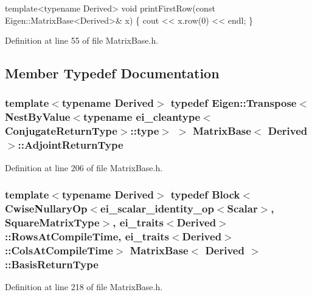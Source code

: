 \begin{DoxyCode}
\textcolor{keyword}{template}<\textcolor{keyword}{typename} Derived>
\textcolor{keywordtype}{void} printFirstRow(\textcolor{keyword}{const} Eigen::MatrixBase<Derived>& x)
\{
  cout << x.row(0) << endl;
\}
\end{DoxyCode}
 

Definition at line 55 of file Matrix\-Base.\-h.



\subsection{Member Typedef Documentation}
\hypertarget{class_matrix_base_ab0fa2c6c89d49eb6021904ed1e016704}{
\subsubsection[{Adjoint\-Return\-Type}]{\setlength{\rightskip}{0pt plus 5cm}template$<$typename Derived$>$ typedef Eigen\-::\-Transpose$<${\bf Nest\-By\-Value}$<$typename {\bf ei\-\_\-cleantype}$<${\bf Conjugate\-Return\-Type}$>$\-::{\bf type}$>$ $>$ {\bf Matrix\-Base}$<$ Derived $>$\-::{\bf Adjoint\-Return\-Type}}}\label{class_matrix_base_ab0fa2c6c89d49eb6021904ed1e016704}


Definition at line 206 of file Matrix\-Base.\-h.

\hypertarget{class_matrix_base_a466099fb1cf0970242cbf8011bb1adfd}{
\subsubsection[{Basis\-Return\-Type}]{\setlength{\rightskip}{0pt plus 5cm}template$<$typename Derived$>$ typedef {\bf Block}$<${\bf Cwise\-Nullary\-Op}$<${\bf ei\-\_\-scalar\-\_\-identity\-\_\-op}$<${\bf Scalar}$>$, {\bf Square\-Matrix\-Type}$>$, {\bf ei\-\_\-traits}$<$Derived$>$\-::{\bf Rows\-At\-Compile\-Time}, {\bf ei\-\_\-traits}$<$Derived$>$\-::{\bf Cols\-At\-Compile\-Time}$>$ {\bf Matrix\-Base}$<$ Derived $>$\-::{\bf Basis\-Return\-Type}}}\label{class_matrix_base_a466099fb1cf0970242cbf8011bb1adfd}


Definition at line 218 of file Matrix\-Base.\-h.

